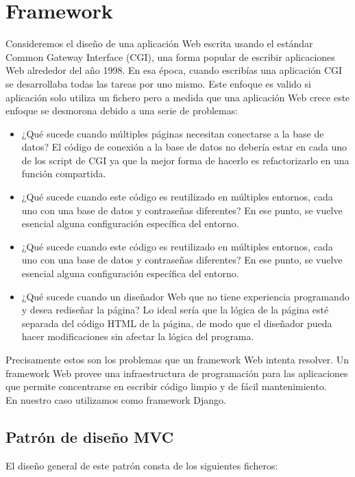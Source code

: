 \section{Framework}
Consideremos el diseño de una aplicación Web escrita usando el estándar Common Gateway Interface (CGI), una forma popular de escribir aplicaciones Web alrededor del año 1998. En esa época, cuando escribías una aplicación CGI se desarrollaba todas las tareas por uno mismo.
Este enfoque es valido si aplicación solo utiliza un fichero pero a medida que una aplicación Web crece este enfoque se desmorona debido a una serie de problemas:
\begin{itemize}
\item ¿Qué sucede cuando múltiples páginas necesitan conectarse a la base de datos? El código de conexión a la base de datos no debería estar en cada uno de los script de CGI ya que la mejor forma de hacerlo es refactorizarlo en una función compartida.
\item ¿Qué sucede cuando este código es reutilizado en múltiples entornos, cada uno con una base de datos y contraseñas diferentes? En ese punto, se vuelve esencial alguna configuración específica del entorno.
\item ¿Qué sucede cuando este código es reutilizado en múltiples entornos, cada uno con una base de datos y contraseñas diferentes? En ese punto, se vuelve esencial alguna configuración específica del entorno.
\item ¿Qué sucede cuando un diseñador Web que no tiene experiencia programando y desea rediseñar la página? Lo ideal sería que la lógica de la página esté separada del código HTML de la página, de modo que el diseñador pueda hacer modificaciones sin afectar la lógica del programa.
\end{itemize}
Precisamente estos son los problemas que un framework Web intenta resolver. Un framework Web provee una infraestructura de programación para las aplicaciones que permite concentrarse en escribir código limpio y de fácil mantenimiento.
\\En nuestro caso utilizamos como framework Django\cite{django}.
\subsection{Patrón de diseño MVC}
El diseño general de este patrón consta de los siguientes ficheros:
